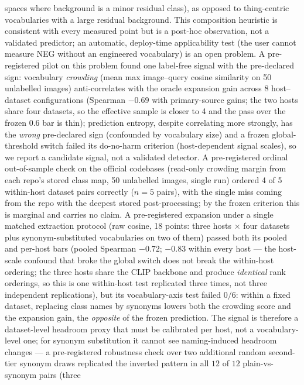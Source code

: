 \documentclass[11pt]{article}
\begin{document}
spaces where background is a minor residual class), as opposed to
thing-centric vocabularies with a large residual background. This
composition heuristic is consistent with every measured point but is a
post-hoc observation, not a validated predictor; an automatic, deploy-time
applicability test (the user cannot measure NEG without an engineered
vocabulary) is an open problem. A pre-registered pilot on this problem
found one label-free signal with the pre-declared sign: vocabulary
\emph{crowding} (mean max image--query cosine similarity on 50 unlabelled
images) anti-correlates with the oracle expansion gain across 8
host--dataset configurations (Spearman $-0.69$ with primary-source
gains; the two hosts share four datasets, so the effective sample is
closer to 4 and the pass over the frozen $0.6$ bar is thin); prediction
entropy,
despite correlating more strongly, has the \emph{wrong} pre-declared sign
(confounded by vocabulary size) and a frozen global-threshold switch
failed its do-no-harm criterion (host-dependent signal scales), so we
report a candidate signal, not a validated detector. A pre-registered
ordinal out-of-sample check on the official codebases (read-only crowding
margin from each repo's stored class map, 50 unlabelled images, single
run) ordered 4 of 5 within-host dataset pairs correctly ($n=5$ pairs),
with the single miss coming from the repo with the deepest stored
post-processing; by the frozen criterion this is marginal and carries no
claim. A pre-registered expansion under a single matched extraction
protocol (raw cosine, 18 points: three hosts $\times$ four datasets
plus synonym-substituted vocabularies on two of them) passed both its
pooled and per-host bars (pooled Spearman $-0.72$; $-0.83$ within
every host --- the host-scale confound that broke the global switch
does not break the within-host ordering; the three hosts share the
CLIP backbone and produce \emph{identical} rank orderings, so this is
one within-host test replicated three times, not three independent
replications), but its vocabulary-axis
test failed $0/6$: within a fixed dataset, replacing class names by
synonyms lowers both the crowding score and the expansion gain, the
\emph{opposite} of the frozen prediction. The signal is therefore a
dataset-level headroom proxy that must be calibrated per host, not a
vocabulary-level one; for synonym substitution it cannot see
naming-induced headroom changes --- a pre-registered robustness check
over two additional random second-tier synonym draws replicated the
inverted pattern in all $12$ of $12$ plain-vs-synonym pairs (three
\end{document}
